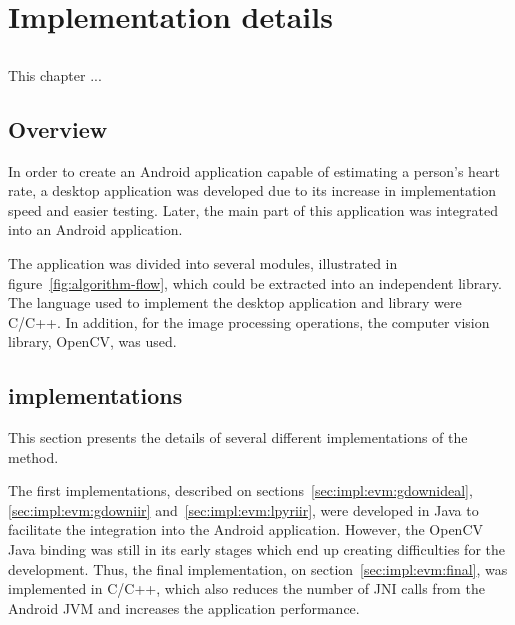 \chapter{Implementation details} \label{chap:impl}

\section*{}


This chapter ...

\section{Overview} \label{sec:sol:overview}


In order to create an Android application capable of estimating a person's
heart rate, a desktop application was developed due to its increase in
implementation speed and easier testing. Later, the main part of this
application was integrated into an Android application.

The application was divided into several modules, illustrated in
figure~\ref{fig:algorithm-flow}, which could be extracted into an independent
library. The language used to implement the desktop application and library
were C/C++. In addition, for the image processing operations, the
computer vision library, OpenCV, was used.


\section{\evm{} implementations} \label{sec:impl:evm}


This section presents the details of several different implementations of the
\evm{} method.

The first implementations, described on sections~\ref{sec:impl:evm:gdownideal},
\ref{sec:impl:evm:gdowniir} and~\ref{sec:impl:evm:lpyriir},
were developed in Java to facilitate the integration into the Android
application. However, the OpenCV Java binding was still in its early stages
which end up creating difficulties for the development. Thus, the final
implementation, on section~\ref{sec:impl:evm:final}, was implemented in C/C++,
which also reduces the number of JNI calls from the Android JVM and
increases the application performance.

